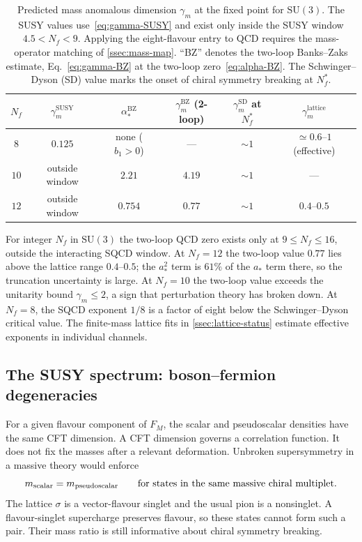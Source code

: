 \documentclass[11pt,a4paper]{article}
\theoremstyle{plain}
\theoremstyle{definition}
\theoremstyle{remark}
\newcommand{\Nf}{N_{\!f}}
\newcommand{\Nfstar}{\Nf^*}
\newcommand{\SU}[1]{\mathrm{SU}(#1)}
\newcommand{\BZ}{\ensuremath{\mathrm{BZ}}}
\begin{document}
\begin{table}[ht]
\centering
\renewcommand{\arraystretch}{1.3}
\caption{Predicted mass anomalous dimension $\gamma_m$ at the fixed
  point for $\SU{3}$.  The SUSY values use~\eqref{eq:gamma-SUSY} and
  exist only inside the SUSY window $4.5 < \Nf < 9$.  Applying the
  eight-flavour entry to QCD requires the mass-operator matching of
  \cref{ssec:mass-map}.  ``BZ'' denotes the
  two-loop Banks--Zaks estimate, Eq.~\eqref{eq:gamma-BZ} at the
  two-loop zero~\eqref{eq:alpha-BZ}.  The Schwinger--Dyson (SD) value
  marks the onset of chiral symmetry breaking at $\Nfstar$.}
\label{tab:gamma-predictions}
\begin{tabular}{@{} c c c c c c @{}}
\toprule
$\Nf$ & $\gamma_m^{\mathrm{SUSY}}$ & $\alpha_*^{\BZ}$ &
  $\gamma_m^{\BZ}$ (2-loop) &
  $\gamma_m^{\mathrm{SD}}$ at $\Nfstar$ &
  $\gamma_m^{\mathrm{lattice}}$ \\
\midrule
$8$  & $0.125$ & none ($b_1 > 0$) & --- & $\sim 1$ &
  $\simeq 0.6$--$1$ (effective) \\
$10$ & outside window & $2.21$ & $4.19$ & $\sim 1$ & --- \\
$12$ & outside window & $0.754$ & $0.77$ & $\sim 1$ &
  $0.4$--$0.5$ \\
\bottomrule
\end{tabular}
\end{table}

For integer $\Nf$ in $\SU{3}$ the two-loop QCD zero exists only at
$9\leq\Nf\leq16$, outside the interacting SQCD window.
At $\Nf = 12$ the two-loop value $0.77$ lies above the lattice range
$0.4$--$0.5$; the $a_*^2$ term is $61\%$ of the $a_*$ term there, so the
truncation uncertainty is large.  At $\Nf = 10$ the two-loop value
exceeds the unitarity bound $\gamma_m \leq 2$, a sign that perturbation
theory has broken down.  At $\Nf=8$, the SQCD exponent $1/8$ is a
factor of eight below the Schwinger--Dyson critical value.  The
finite-mass lattice fits in \cref{ssec:lattice-status} estimate
effective exponents in individual channels.

\subsection{The SUSY spectrum: boson--fermion degeneracies}
\label{ssec:spectrum}

For a given flavour component of $F_M$, the scalar and pseudoscalar
densities have the same CFT dimension.  A CFT dimension governs a
correlation function.  It does not fix the masses after a relevant
deformation.  Unbroken supersymmetry in a massive theory would enforce
\begin{equation}\label{eq:sigma-pi}
  m_{\rm scalar}=m_{\rm pseudoscalar}
  \qquad\text{for states in the same massive chiral multiplet}.
\end{equation}
The lattice $\sigma$ is a vector-flavour singlet and the usual pion
is a nonsinglet.  A flavour-singlet supercharge preserves flavour, so
these states cannot form such a pair.  Their mass ratio is still
informative about chiral symmetry breaking.
\end{document}
